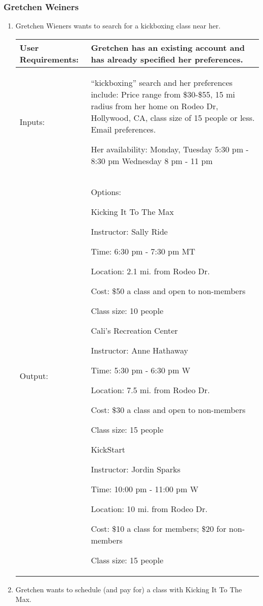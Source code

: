 \documentclass[12pt]{article}
\begin{document}
\subsubsection{Gretchen Weiners}
\begin{enumerate}
\item Gretchen Wieners wants to search for a kickboxing class near her.

\begin{tabular}{| m{4cm} | m{11cm} |}
\hline
User Requirements: & Gretchen has an existing account and has already specified her preferences. \\
\hline
Inputs: & “kickboxing” search and her preferences include:
Price range from \$30-\$55, 15 mi radius from her home on Rodeo Dr, Hollywood, CA, class size of 15 people or less. Email preferences.

Her availability:
Monday, Tuesday 5:30 pm - 8:30 pm
Wednesday 8 pm - 11 pm 
\\
\hline
Output: & Options:

Kicking It To The Max 

Instructor: Sally Ride

Time: 6:30 pm - 7:30 pm MT

Location: 2.1 mi. from Rodeo Dr.

Cost: \$50 a class and open to non-members

Class size: 10 people
\newline

Cali’s Recreation Center 

Instructor: Anne Hathaway

Time: 5:30 pm - 6:30 pm W

Location: 7.5 mi. from Rodeo Dr.

Cost: \$30 a class and open to non-members

Class size: 15 people
\newline

KickStart

Instructor: Jordin Sparks

Time: 10:00 pm - 11:00 pm W

Location: 10 mi. from Rodeo Dr. 

Cost: \$10 a class for members; \$20 for non-members

Class size: 15 people\\

\hline
\end{tabular}

\item Gretchen wants to schedule (and pay for) a class with Kicking It To The Max.


\end{enumerate}
\end{document}
